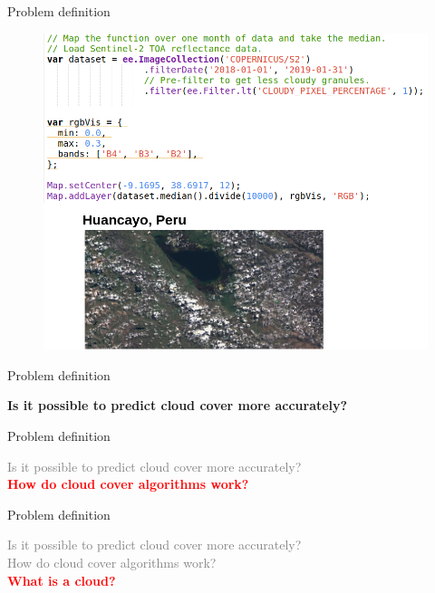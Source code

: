 \begin{frame}{Problem definition}
	\begin{center}
		\begin{figure}
			\includegraphics[width=0.76\linewidth]{images/problematic_03.png}
		\end{figure}
	\end{center}
\end{frame}


\begin{frame}{Problem definition}
	\begin{center}
		\textbf{\Large{Is it possible to predict cloud cover more accurately?}}\\
	\end{center}
\end{frame}

\begin{frame}{Problem definition}
	\begin{center}
		\textcolor{gray}{\large{Is it possible to predict cloud cover more accurately?}}\\
		\textcolor{red}{\textbf{\Large{How do cloud cover algorithms work?}}}
		
	\end{center}
\end{frame}


\begin{frame}{Problem definition}
	\begin{center}
		\textcolor{gray}{\large{Is it possible to predict cloud cover more accurately?}}\\
		\textcolor{gray}{\large{How do cloud cover algorithms work?}}\\
		\textcolor{red}{\textbf{\Large{What is a cloud?}}}				
	\end{center}
\end{frame}
